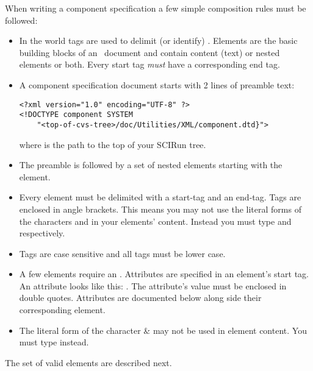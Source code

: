 \documentclass[11pt]{article}
\begin{document}
When writing a component specification a few simple composition rules
must be followed:

\begin{itemize}
\item In the \xml{} world tags are used to delimit (or identify)
  .  Elements are the basic building blocks of an \xml\
  document and contain content (text) or nested elements or both.
  Every start tag \emph{must} have a corresponding end tag.
  
\item A component specification document starts with 2 lines of preamble
  text:

\begin{verbatim}
<?xml version="1.0" encoding="UTF-8" ?>
<!DOCTYPE component SYSTEM 
    "<top-of-cvs-tree>/doc/Utilities/XML/component.dtd}">
\end{verbatim}

  where  is the path to the top of your
  SCIRun \cvs{} tree. 
  
\item The preamble is followed by a set of nested elements starting with
  the \element{component} element.
  
\item Every element must be delimited with a start-tag and an end-tag.
  Tags are enclosed in angle brackets.  This means you may not use
  the literal forms of the characters \keyboard{\la} and
  \keyboard{\ra} in your elements' content.  Instead you must type
  \keyboard{\&lt;} and \keyboard{\&gt;} respectively.

\item Tags are case sensitive and all tags must be lower case.
  
\item A few elements require an .  Attributes are specified
  in an element's start tag.  An attribute looks like this:
  .  The attribute's value
  must be enclosed in double quotes. Attributes are documented below
  along side their corresponding element.
  
\item The literal form of the character \& may not be used in element
  content.  You must type \keyboard{\&amp;} instead.

\end{itemize}

The set of valid elements are described next.
\end{document}
